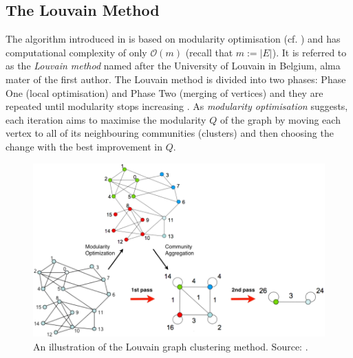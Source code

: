 \documentclass{prettytex/ox/mmsc-special-topic}
\begin{document}
  \subsection{The Louvain Method}
  \label{sec:louvain}
  The algorithm introduced in \cite{lambiotte-louvain-clustering} is based on modularity optimisation (cf. ) and has computational complexity of only $\mathcal{O}(m)$ (recall that $m := |E|$).
  It is referred to as the \textit{Louvain method} named after the University of Louvain in Belgium, alma mater of the first author.
  The Louvain method is divided into two phases: Phase One (local optimisation) and Phase Two (merging of vertices) and they are repeated until modularity stops increasing \parencite{lambiotte-louvain-clustering}.
  As \textit{modularity optimisation} suggests, each iteration aims to maximise the modularity $Q$ of the graph by moving each vertex to all of its neighbouring communities (clusters) and then choosing the change with the best improvement in $Q$.

  \begin{figure}[H]
    \centering
    \includegraphics[width=\linewidth]{figures/blondel.png}
    \caption{An illustration of the Louvain graph clustering method. Source: \cite{lambiotte-louvain-clustering}.}
  \end{figure}
\end{document}
